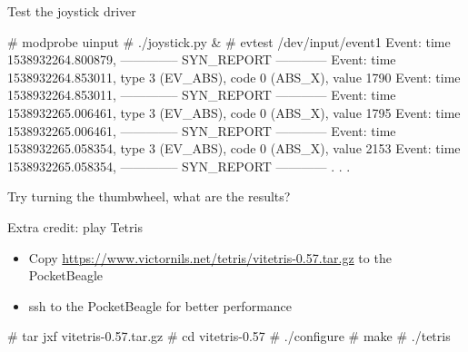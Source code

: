 \begin{frame}
    {Test the joystick driver}

	\begin{rawscriptsize}
		# modprobe uinput
		# ./joystick.py &
		# evtest /dev/input/event1
		Event: time 1538932264.800879, -------------- SYN_REPORT ------------
		Event: time 1538932264.853011, type 3 (EV_ABS), code 0 (ABS_X), value 1790
		Event: time 1538932264.853011, -------------- SYN_REPORT ------------
		Event: time 1538932265.006461, type 3 (EV_ABS), code 0 (ABS_X), value 1795
		Event: time 1538932265.006461, -------------- SYN_REPORT ------------
		Event: time 1538932265.058354, type 3 (EV_ABS), code 0 (ABS_X), value 2153
		Event: time 1538932265.058354, -------------- SYN_REPORT ------------
		.
		.
		.
	\end{rawscriptsize}

	Try turning the thumbwheel, what are the results?
\end{frame}

\begin{frame}
    {Extra credit: play Tetris}

	\begin{itemize}
	\item
		Copy \url{https://www.victornils.net/tetris/vitetris-0.57.tar.gz} to the PocketBeagle
	\item
		ssh to the PocketBeagle for better performance
	\end{itemize}

	\begin{rawscriptsize}
	# tar jxf vitetris-0.57.tar.gz
	# cd vitetris-0.57
	# ./configure
	# make
	# ./tetris
	\end{rawscriptsize}
\end{frame}

